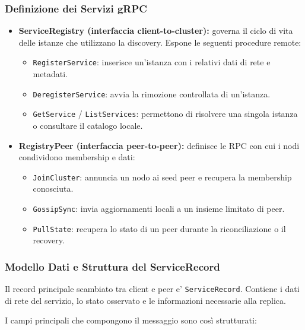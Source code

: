 \documentclass[conference]{IEEEtran}
\begin{document}
\subsubsection{Definizione dei Servizi gRPC}
\begin{itemize}[leftmargin=1.2cm]
  \item \textbf{ServiceRegistry (interfaccia client-to-cluster):} governa il ciclo di vita delle istanze che utilizzano la discovery. Espone le seguenti procedure remote:
  \begin{itemize}
    \item \texttt{RegisterService}: inserisce un'istanza con i relativi dati di rete e metadati.
    \item \texttt{DeregisterService}: avvia la rimozione controllata di un'istanza.
    \item \texttt{GetService} / \texttt{ListServices}: permettono di risolvere una singola istanza o consultare il catalogo locale.
  \end{itemize}

  \item \textbf{RegistryPeer (interfaccia peer-to-peer):} definisce le RPC con cui i nodi condividono membership e dati:
  \begin{itemize}
    \item \texttt{JoinCluster}: annuncia un nodo ai seed peer e recupera la membership conosciuta.
    \item \texttt{GossipSync}: invia aggiornamenti locali a un insieme limitato di peer.
    \item \texttt{PullState}: recupera lo stato di un peer durante la riconciliazione o il recovery.
  \end{itemize}
\end{itemize}

\subsubsection{Modello Dati e Struttura del ServiceRecord}
Il record principale scambiato tra client e peer e' \texttt{ServiceRecord}. Contiene i dati di rete del servizio, lo stato osservato e le informazioni necessarie alla replica.

I campi principali che compongono il messaggio sono così strutturati:
\end{document}
